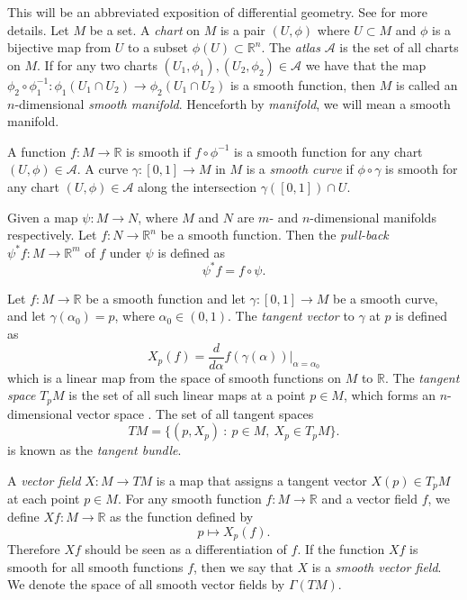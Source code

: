 This will be an abbreviated exposition of differential geometry. See \citep{misnerGravitation2017} for more details. Let $M$ be a set. A \textit{chart} on $M$ is a pair $(U, \phi)$ where $U \subset M$ and $\phi$ is a bijective map from $U$ to a subset $\phi(U) \subset \mathbb{R}^n$. The \textit{atlas} $\mathcal{A}$ is the set of all charts on $M$. If for any two charts $(U_1, \phi_1), (U_2, \phi_2) \in \mathcal{A}$ we have that the map $\phi_2 \circ \phi_1^{-1} : \phi_1( U_1 \cap U_2) \to \phi_2( U_1 \cap U_2)$ is a smooth function, then $M$ is called an $n$-dimensional \textit{smooth manifold}. Henceforth by \textit{manifold}, we will mean a smooth manifold.

A function $f : M \to \mathbb{R}$ is smooth if $f \circ \phi^{-1}$ is a smooth function for any chart $(U, \phi) \in \mathcal{A}$. A curve $\gamma : [0, 1] \to M$ in $M$ is a \textit{smooth curve} if $\phi \circ \gamma$ is smooth for any chart $(U, \phi) \in \mathcal{A}$ along the intersection $\gamma([0,1]) \cap U$.

Given a map $\psi : M \to N$, where $M$ and $N$ are $m$- and $n$-dimensional manifolds respectively. Let $f : N \to \mathbb{R}^n$ be a smooth function. Then the \textit{pull-back} $\psi^* f : M \to \mathbb{R}^m$ of $f$ under $\psi$ is defined as
\begin{equation}
	\psi^* f = f \circ \psi.
\end{equation}

Let $f : M \to \mathbb{R}$ be a smooth function and let $\gamma : [0, 1] \to M$ be a smooth curve, and let $\gamma(\alpha_0) = p$, where $\alpha_0 \in (0,1)$. The \textit{tangent vector} to $\gamma$ at $p$ is defined as
\begin{equation}
	X_p(f) = \frac{d}{d \alpha} f(\gamma(\alpha)) \bigg|_{\alpha = \alpha_0}
\end{equation}
which is a linear map from the space of smooth functions on $M$ to $\mathbb{R}$. The \textit{tangent space} $T_p M$ is the set of all such linear maps at a point $p \in M$, which forms an $n$-dimensional vector space \citep{misnerGravitation2017}. The set of all tangent spaces
\begin{equation}
	TM = \{ (p, X_p)\ :\ p \in M,\ X_p \in T_p M \}.
\end{equation}
is known as the \textit{tangent bundle}.

A \textit{vector field} $X : M \to TM$ is a map that assigns a tangent vector $X(p) \in T_p M$ at each point $p \in M$. For any smooth function $f : M \to \mathbb{R}$ and a vector field $f$, we define $X f: M \to \mathbb{R}$ as the function defined by
\begin{equation}
p \mapsto X_p(f).
\end{equation}
Therefore $X f$ should be seen as a differentiation of $f$. If the function $X f$ is smooth for all smooth functions $f$, then we say that $X$ is a \textit{smooth vector field}. We denote the space of all smooth vector fields by $\Gamma(TM)$. 

